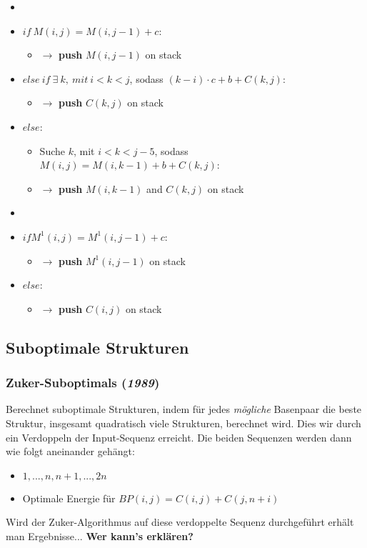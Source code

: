 \begin{itemize}
\begin{itemize}
		\item[]
		\item[] $if~M(i,j) = M(i,j-1) + c$:
			\begin{itemize}
				\item[] $\rightarrow$ \textbf{push} $M(i, j-1)$ on stack
			\end{itemize}
		\item[] $else~if~\exists~k,~mit~i < k < j$, sodass $(k-i) \cdot c + b + C(k,j)$:
			\begin{itemize}
				\item[] $\rightarrow$ \textbf{push} $C(k,j)$ on stack
			\end{itemize}
		\item[] $else$:
			\begin{itemize}
				\item[] Suche $k$, mit $i < k < j-5$, sodass $M(i,j) = M(i, k-1) + b + C(k,j)$:
				\item[] $\rightarrow$ \textbf{push} $M(i, k-1)$ and $C(k,j)$ on stack
			\end{itemize}
		\item[]
		\item[] $if M^1(i,j) = M^1(i,j-1) + c$:
			\begin{itemize}
				\item[] $\rightarrow$ \textbf{push} $M^1(i, j-1)$ on stack
			\end{itemize}
		\item[] $else$:
			\begin{itemize}
				\item[] $\rightarrow$ \textbf{push} $C(i, j)$ on stack
			\end{itemize}
	\end{itemize}
\end{itemize}


\subsection{Suboptimale Strukturen}

\subsubsection{ Zuker-Suboptimals (\textit{1989})}
Berechnet suboptimale Strukturen, indem für jedes \textit{m\"ogliche} Basenpaar die beste Struktur, insgesamt quadratisch viele Strukturen, berechnet wird. Dies wir durch ein Verdoppeln der Input-Sequenz erreicht. Die beiden Sequenzen werden dann wie folgt aneinander geh\"angt:
\begin{itemize}
\item[]$1, .. .,n, n+1, ..., 2n$
\item[]Optimale Energie f\"ur $BP(i,j)=C(i,j)+C(j, n+i)$
\end{itemize}
Wird der Zuker-Algorithmus auf diese verdoppelte Sequenz durchgef\"uhrt erh\"alt man Ergebnisse...\textbf{ Wer kann's erkl\"aren?}

